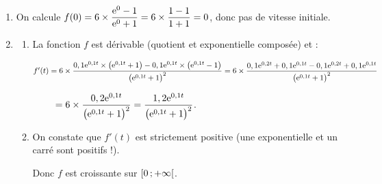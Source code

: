\documentclass[a4paper,11pt]{article}
\begin{document}
\begin{enumerate}
	\item On calcule $f(0)=6\times\dfrac{{\rm e}^{0}-1}{{\rm e}^{0}+1}=6\times\dfrac{1-1}{1+1}=0$, donc pas de vitesse initiale.
	\item 
	\begin{enumerate}
		\item La fonction $f$ est dérivable (quotient et exponentielle composée) et :
		
		\hspace{5mm}$f'(t)=6 \times \dfrac{0,1{\rm e}^{0,1t} \times \big({\rm e}^{0,1t}+1\big)-0,1{\rm e}^{0,1t}\times\big({\rm e}^{0,1t}-1\big)}{\big({\rm e}^{0,1t}+1\big)^2} = 6 \times \dfrac{0,1{\rm e}^{0,2t}+0,1{\rm e}^{0,1t}-0,1{\rm e}^{0,2t}+0,1{\rm e}^{0,1t}}{\big({\rm e}^{0,1t}+1\big)^2}$
		
		\hspace{5mm}$\phantom{f'(t)}= 6 \times \dfrac{0,2{\rm e}^{0,1t}}{\big({\rm e}^{0,1t}+1\big)^2} = \dfrac{1,2{\rm e}^{0,1t}}{\big({\rm e}^{0,1t}+1\big)^2}$.
		\item On constate que $f'(t)$ est strictement positive (une exponentielle et un carré sont positifs !).
		
		Donc $f$ est croissante sur $\mbox{\ensuremath{\left[0\mathpunct{};+\infty\right[}}$.
	\end{enumerate}
\end{enumerate}

\medskip

\end{document}

